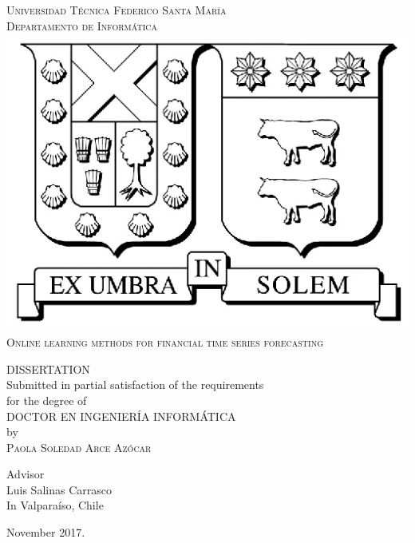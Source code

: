 \thispagestyle{empty}
\vspace{1.5in}
\begin{center}
{\textsc{Universidad T\'ecnica Federico Santa Mar\'ia}}\\
{\textsc{Departamento de Inform\'atica}}\\
\medskip
\includegraphics[scale=1]{fig/logo_usm.eps}
\bigskip
\bigskip
\bigskip
\bigskip \\
{\textsc{\Large{{Online learning methods for financial time series forecasting}}}}\\%

\bigskip
\bigskip
\bigskip
\bigskip
\bigskip 

{\MakeUppercase{Dissertation}\\
\bigskip
\bigskip
Submitted in partial satisfaction of the requirements\\
for the degree of\\
\bigskip
\bigskip
\MakeUppercase{Doctor en Ingenier\'ia Inform\'atica}\\
\bigskip
\bigskip
by\\
\bigskip
{\textsc{\large{Paola Soledad Arce Az\'ocar}}}\\
\bigskip

\bigskip
Advisor\\
Luis Salinas Carrasco\\
\bigskip
\bigskip
In Valpara\'iso, Chile}
\end{center}


\begin{center}
{\normalsize November 2017.}
\end{center}

\pagebreak

